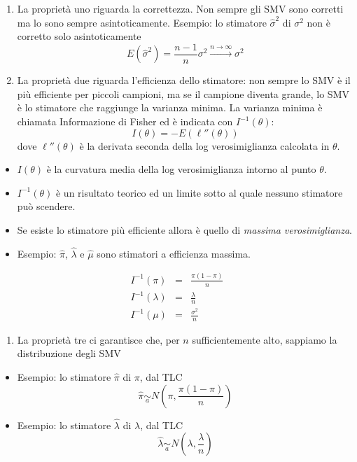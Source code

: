 \documentclass[
  11pt,
]{book}
\providecommand{\tightlist}{%
  \setlength{\itemsep}{0pt}\setlength{\parskip}{0pt}}
\theoremstyle{mytheoremstyle}
\theoremstyle{mydefstyle}
\begin{document}
\begin{enumerate}
\def\labelenumi{\arabic{enumi}.}
\tightlist
\item
  La proprietà uno riguarda la correttezza. Non sempre gli SMV sono corretti
  ma lo sono sempre asintoticamente. Esempio: lo stimatore \(\hat\sigma^2\) di \(\sigma^2\) non è corretto solo asintoticamente
  \[E(\hat\sigma^2)=\frac{n-1}{n}\sigma^2\xrightarrow{n\to\infty}\sigma^2\]
\item
  La proprietà due riguarda l'efficienza dello stimatore: non sempre lo
  SMV è il più efficiente per piccoli campioni, ma se il campione diventa grande, lo
  SMV è lo stimatore che raggiunge la varianza minima. La varianza minima è chiamata Informazione di Fisher ed è indicata con \(I^{-1}(\theta)\):
  \[
    I(\theta)=-E\left(\ell''(\theta)\right)
  \]
  dove \(\ell''(\theta)\) è la derivata seconda della log verosimiglianza calcolata in \(\theta\).
\end{enumerate}

\begin{itemize}
\tightlist
\item
  \(I(\theta)\) è la curvatura media della log verosimiglianza intorno al punto \(\theta\).
\item
  \(I^{-1}(\theta)\) è un risultato teorico ed un limite sotto al quale nessuno stimatore può scendere.
\item
  Se esiste lo stimatore più efficiente allora è quello di \emph{massima verosimiglianza}.
\item
  Esempio: \(\hat\pi\), \(\hat\lambda\) e \(\hat\mu\) sono stimatori a efficienza massima.
\end{itemize}

\begin{eqnarray*}
   I^{-1}(\pi) &=&  \frac{\pi(1-\pi)}{n}\\
   I^{-1}(\lambda) &=&  \frac{\lambda}{n}\\
   I^{-1}(\mu) &=&  \frac{\sigma^2}{n}
\end{eqnarray*}

\begin{enumerate}
\def\labelenumi{\arabic{enumi}.}
\setcounter{enumi}{2}
\tightlist
\item
  La proprietà tre ci garantisce che, per \(n\) sufficientemente alto, sappiamo
  la distribuzione degli SMV
\end{enumerate}

\begin{itemize}
\tightlist
\item
  Esempio: lo stimatore \(\hat\pi\) di \(\pi\), dal TLC
  \[\hat\pi\operatorname*{\sim}_a N\left(\pi,\frac{\pi(1-\pi)}{n}\right)\]
\item
  Esempio: lo stimatore \(\hat\lambda\) di \(\lambda\), dal TLC
  \[\hat\lambda\operatorname*{\sim}_a N\left(\lambda,\frac{\lambda}{n}\right)\]
\end{itemize}
\end{document}
